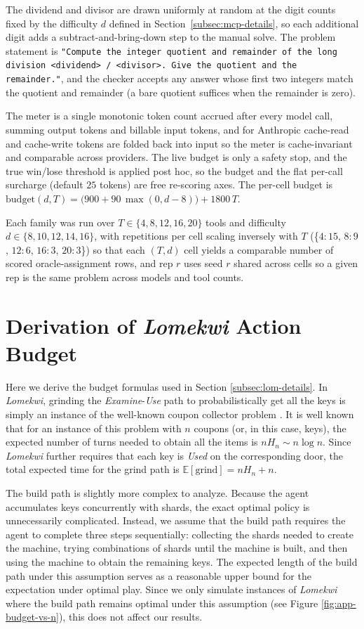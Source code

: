 \documentclass{article}
\begin{document}
The dividend and divisor are drawn uniformly at random at the digit counts fixed by the difficulty $d$ defined in Section~\ref{subsec:mcp-details}, so each additional digit adds a subtract-and-bring-down step to the manual solve. The problem statement is \texttt{"Compute the integer quotient and remainder of the long division <dividend> / <divisor>. Give the quotient and the remainder."}, and the checker accepts any answer whose first two integers match the quotient and remainder (a bare quotient suffices when the remainder is zero).

The meter is a single monotonic token count accrued after every model call, summing output tokens and billable input tokens, and for Anthropic cache-read and cache-write tokens are folded back into input so the meter is cache-invariant and comparable across providers. The live budget is only a safety stop, and the true win/lose threshold is applied post hoc, so the budget and the flat per-call surcharge (default $25$ tokens) are free re-scoring axes. The per-cell budget is $\mathrm{budget}(d, T) = \big(900 + 90\,\max(0, d-8)\big) + 1800\,T$.

Each family was run over $T \in \{4, 8, 12, 16, 20\}$ tools and difficulty $d \in \{8, 10, 12, 14, 16\}$, with repetitions per cell scaling inversely with $T$ (\{$4{:}15$, $8{:}9$, $12{:}6$, $16{:}3$, $20{:}3$\}) so that each $(T, d)$ cell yields a comparable number of scored oracle-assignment rows, and rep $r$ uses seed $r$ shared across cells so a given rep is the same problem across models and tool counts.


\section{Derivation of \textit{Lomekwi} Action Budget}
\label{app:cost}

Here we derive the budget formulas used in Section \ref{subsec:lom-details}. In \textit{Lomekwi}, grinding the \textit{Examine}-\textit{Use} path to probabilistically get all the keys is simply an instance of the well-known coupon collector problem \citep{flajolet1992coupon}. It is well known that for an instance of this problem with $n$ coupons (or, in this case, keys), the expected number of turns needed to obtain all the items is $nH_n\sim n\log n$. Since \textit{Lomekwi} further requires that each key is \textit{Used} on the corresponding door, the total expected time for the grind path is $\mathbb{E}[\text{grind}]=nH_n+n.$

The build path is slightly more complex to analyze. Because the agent accumulates keys concurrently with shards, the exact optimal policy is unnecessarily complicated. Instead, we assume that the build path requires the agent to complete three steps sequentially: collecting the shards needed to create the machine, trying combinations of shards until the machine is built, and then using the machine to obtain the remaining keys. The expected length of the build path under this assumption serves as a reasonable upper bound for the expectation under optimal play. Since we only simulate instances of \textit{Lomekwi} where the build path remains optimal under this assumption (see Figure \ref{fig:app-budget-vs-n}), this does not affect our results.
\end{document}
